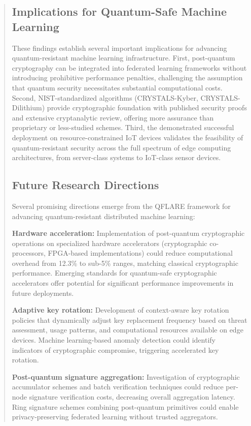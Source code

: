 \documentclass{svproc}
\begin{document}
\begin{abstract}
\subsection{Implications for Quantum-Safe Machine Learning}

These findings establish several important implications for advancing quantum-resistant machine learning infrastructure. First, post-quantum cryptography can be integrated into federated learning frameworks without introducing prohibitive performance penalties, challenging the assumption that quantum security necessitates substantial computational costs. Second, NIST-standardized algorithms (CRYSTALS-Kyber, CRYSTALS-Dilithium) provide cryptographic foundation with published security proofs and extensive cryptanalytic review, offering more assurance than proprietary or less-studied schemes. Third, the demonstrated successful deployment on resource-constrained IoT devices validates the feasibility of quantum-resistant security across the full spectrum of edge computing architectures, from server-class systems to IoT-class sensor devices.

\subsection{Future Research Directions}

Several promising directions emerge from the QFLARE framework for advancing quantum-resistant distributed machine learning:

\textbf{Hardware acceleration:} Implementation of post-quantum cryptographic operations on specialized hardware accelerators (cryptographic co-processors, FPGA-based implementations) could reduce computational overhead from 12.3\% to sub-5\% ranges, matching classical cryptographic performance. Emerging standards for quantum-safe cryptographic accelerators offer potential for significant performance improvements in future deployments.

\textbf{Adaptive key rotation:} Development of context-aware key rotation policies that dynamically adjust key replacement frequency based on threat assessment, usage patterns, and computational resources available on edge devices. Machine learning-based anomaly detection could identify indicators of cryptographic compromise, triggering accelerated key rotation.

\textbf{Post-quantum signature aggregation:} Investigation of cryptographic accumulator schemes and batch verification techniques could reduce per-node signature verification costs, decreasing overall aggregation latency. Ring signature schemes combining post-quantum primitives could enable privacy-preserving federated learning without trusted aggregators.


\end{abstract}
\end{document}
